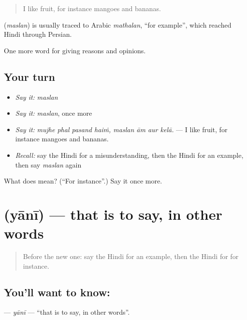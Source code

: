 \begin{quote}
I like fruit, for instance mangoes and bananas.
\end{quote}

\begin{cousinweb}
\textbf{} (\emph{maslan}) is usually traced to Arabic \emph{mathalan}, \textquotedblleft{}for example\textquotedblright{}, which reached Hindi through Persian.
\end{cousinweb}

\begin{grammarlens}[title={What you've built}]
One more word for giving reasons and opinions.
\end{grammarlens}

\subsection*{Your turn}
\begin{itemize}
\raggedright
  \item \emph{Say it:} \emph{maslan}
  \item \emph{Say it:} \emph{maslan}, once more
  \item \emph{Say it:} \emph{mujhe phal pasand haiṁ, maslan ām aur kelā.} — I like fruit, for instance mangoes and bananas.
  \item \emph{Recall:} say the Hindi for a misunderstanding, then the Hindi for an example, then say \emph{maslan} again
\end{itemize}

\begin{tcolorbox}[breakable,colback=teal!4,colframe=teal!35!black,title={Before you move on}]
What does  mean? (\textquotedblleft{}For instance\textquotedblright{}.) Say it once more.
\end{tcolorbox}
\section[\texorpdfstring{\hi{यानी} (yānī)}{यानी (yānī)}]{ (yānī) — that is to say, in other words}

\label{lesson:HI-C350-yani}



\begin{quote}
Before the new one: say the Hindi for an example, then the Hindi for for instance.
\end{quote}

\subsection*{You'll want to know: }
\textbf{} — \emph{yānī} — \textquotedblleft{}that is to say, in other words\textquotedblright{}.

